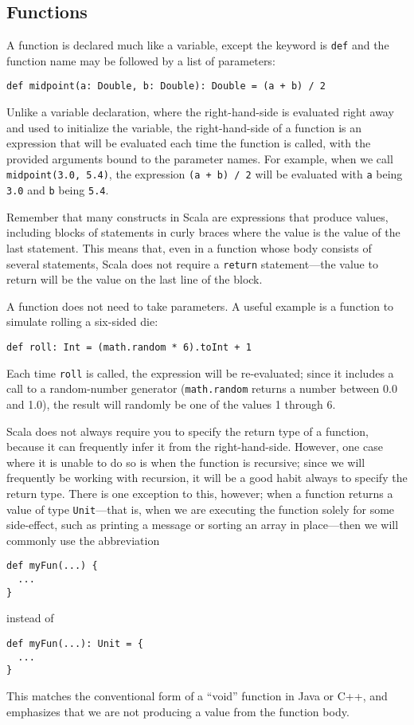 \documentclass[11pt]{article}
\begin{document}
\subsection{Functions}
A function is declared much like a variable, except the keyword is \texttt{def} and the function name may be followed by a list of parameters:
\begin{verbatim}
def midpoint(a: Double, b: Double): Double = (a + b) / 2
\end{verbatim}
Unlike a variable declaration, where the right-hand-side is evaluated right away and used to initialize the variable, the right-hand-side of a function is an expression that will be evaluated each time the function is called, with the provided arguments bound to the parameter names. For example, when we call \texttt{midpoint(3.0, 5.4)}, the expression \texttt{(a + b) / 2} will be evaluated with \texttt{a} being \texttt{3.0} and \texttt{b} being \texttt{5.4}.

Remember that many constructs in Scala are expressions that produce values, including blocks of statements in curly braces where the value is the value of the last statement. This means that, even in a function whose body consists of several statements, Scala does not require a \texttt{return} statement---the value to return will be the value on the last line of the block.

A function does not need to take parameters. A useful example is a function to simulate rolling a six-sided die:
\begin{verbatim}
def roll: Int = (math.random * 6).toInt + 1
\end{verbatim}
Each time \texttt{roll} is called, the expression will be re-evaluated; since it includes a call to a random-number generator (\texttt{math.random} returns a number between 0.0 and 1.0), the result will randomly be one of the values 1 through 6.

Scala does not always require you to specify the return type of a function, because it can frequently infer it from the right-hand-side. However, one case where it is unable to do so is when the function is recursive; since we will frequently be working with recursion, it will be a good habit always to specify the return type. There is one exception to this, however; when a function returns a value of type \texttt{Unit}---that is, when we are executing the function solely for some side-effect, such as printing a message or sorting an array in place---then we will commonly use the abbreviation
\begin{verbatim}
def myFun(...) {
  ...
}
\end{verbatim}
instead of
\begin{verbatim}
def myFun(...): Unit = {
  ...
}
\end{verbatim}
This matches the conventional form of a ``void'' function in Java or C++, and emphasizes that we are not producing a value from the function body.
\end{document}

